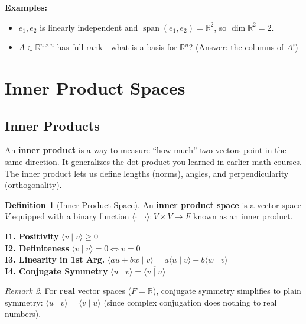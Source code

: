 \documentclass[11pt]{article}
\theoremstyle{definition}
\newtheorem{definition}{Definition}[section]
\theoremstyle{plain}
\theoremstyle{remark}
\newtheorem{remark}[definition]{Remark}
\DeclareMathOperator{\spn}{span}
\begin{document}
\textbf{Examples:}
\begin{itemize}[nosep]
  \item $e_1, e_2$ is linearly independent and $\spn(e_1, e_2) = \mathbb{R}^2$, so $\dim \mathbb{R}^2 = 2$.
  \item $A \in \mathbb{R}^{n \times n}$ has full rank---what is a basis for $\mathbb{R}^n$? (Answer: the columns of $A$!)
\end{itemize}

\newpage
\section{Inner Product Spaces}

\subsection{Inner Products}

\begin{intuitionbox}
An \textbf{inner product} is a way to measure ``how much'' two vectors point in the same direction. It generalizes the dot product you learned in earlier math courses. The inner product lets us define lengths (norms), angles, and perpendicularity (orthogonality).
\end{intuitionbox}

\begin{definition}[Inner Product Space]
An \textbf{inner product space} is a vector space $V$ equipped with a binary function $\langle \cdot \mid \cdot \rangle : V \times V \to F$ known as an inner product.
\end{definition}

\begin{axiombox}
\textbf{I1. Positivity} \hfill $\langle v \mid v \rangle \geq 0$ \\[4pt]
\textbf{I2. Definiteness} \hfill $\langle v \mid v \rangle = 0 \iff v = 0$ \\[4pt]
\textbf{I3. Linearity in 1st Arg.} \hfill $\langle au + bw \mid v \rangle = a\langle u \mid v \rangle + b\langle w \mid v \rangle$ \\[4pt]
\textbf{I4. Conjugate Symmetry} \hfill $\langle u \mid v \rangle = \overline{\langle v \mid u \rangle}$
\end{axiombox}

\begin{remark}
For \textbf{real} vector spaces ($F = \mathbb{R}$), conjugate symmetry simplifies to plain symmetry: $\langle u \mid v \rangle = \langle v \mid u \rangle$ (since complex conjugation does nothing to real numbers).
\end{remark}
\end{document}

